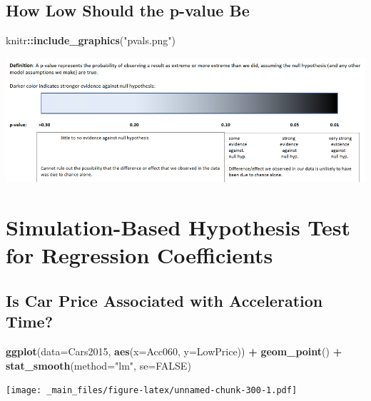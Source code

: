 \documentclass[]{book}
\newenvironment{Shaded}{\begin{snugshade}}{\end{snugshade}}
\newcommand{\KeywordTok}[1]{\textcolor[rgb]{0.13,0.29,0.53}{\textbf{#1}}}
\newcommand{\DataTypeTok}[1]{\textcolor[rgb]{0.13,0.29,0.53}{#1}}
\newcommand{\StringTok}[1]{\textcolor[rgb]{0.31,0.60,0.02}{#1}}
\newcommand{\OtherTok}[1]{\textcolor[rgb]{0.56,0.35,0.01}{#1}}
\newcommand{\OperatorTok}[1]{\textcolor[rgb]{0.81,0.36,0.00}{\textbf{#1}}}
\newcommand{\NormalTok}[1]{#1}
\begin{document}
\subsection{How Low Should the p-value
Be}\label{how-low-should-the-p-value-be}

\begin{Shaded}
\begin{Highlighting}[]
\NormalTok{knitr}\OperatorTok{::}\KeywordTok{include_graphics}\NormalTok{(}\StringTok{"pvals.png"}\NormalTok{)}
\end{Highlighting}
\end{Shaded}

\includegraphics[width=1\linewidth]{pvals}

\section{Simulation-Based Hypothesis Test for Regression
Coefficients}\label{simulation-based-hypothesis-test-for-regression-coefficients}

\subsection{Is Car Price Associated with Acceleration
Time?}\label{is-car-price-associated-with-acceleration-time}

\begin{Shaded}
\begin{Highlighting}[]
\KeywordTok{ggplot}\NormalTok{(}\DataTypeTok{data=}\NormalTok{Cars2015, }\KeywordTok{aes}\NormalTok{(}\DataTypeTok{x=}\NormalTok{Acc060, }\DataTypeTok{y=}\NormalTok{LowPrice)) }\OperatorTok{+}\StringTok{ }\KeywordTok{geom_point}\NormalTok{() }\OperatorTok{+}\StringTok{ }
\StringTok{  }\KeywordTok{stat_smooth}\NormalTok{(}\DataTypeTok{method=}\StringTok{"lm"}\NormalTok{, }\DataTypeTok{se=}\OtherTok{FALSE}\NormalTok{)}
\end{Highlighting}
\end{Shaded}

\texttt{[image: \_main\_files/figure-latex/unnamed-chunk-300-1.pdf]}
\end{document}
